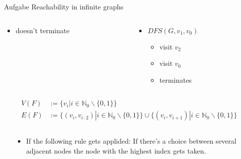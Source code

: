 \begin{frame}[allowframebreaks]{Aufgabe \thesection}{Reachability in infinite graphs}
\begin{solution}
\begin{columns}
\begin{column}[t]{0.5\textwidth}
\begin{columns}
\begin{column}[t]{0.5\linewidth}
\begin{itemize}
\begin{itemize}
                \item doesn't terminate
              \end{itemize}
            \end{itemize}
          \end{column}
          \begin{column}[t]{0.5\linewidth}
            \begin{itemize}
              \item $DFS(G, v_1, v_0)$
              \begin{itemize}
                \item visit $v_2$
                \item visit $v_0$
                \item terminates
              \end{itemize}
            \end{itemize}
          \end{column}
        \end{columns}
      \end{column}
    \end{columns}
  \end{solution}
  \begin{exercisenoinc}
    \begin{align*}
      V(F) &:= \{v_i | i \in \mathbb{N}_0\backslash\{0,1\}\}\\
      E(F) &:= \{(v_i,v_{i\cdot 2})| i\in \mathbb{N}_0\backslash\{0,1\}\} \cup \{(v_i,v_{i+1})|i \in \mathbb{N}_0\backslash\{0,1\}\}
    \end{align*} 
  \end{exercisenoinc}
  \begin{solutionnoinc}
    \begin{columns}
      \begin{column}[t]{0.45\textwidth}
      \end{column}
      \begin{column}[t]{0.5\textwidth}
        \vspace{0.25cm}
        \begin{itemize}
          \item \alert{If the following rule gets applided:} If there's a choice between several adjacent nodes the node with the highest index gets taken.

\end{itemize}
\end{column}
\end{columns}
\end{solutionnoinc}
\end{frame}
